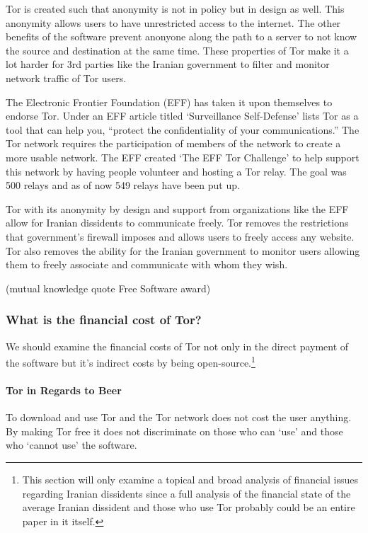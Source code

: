 \documentclass[11pt]{article}
\begin{document}
\begin{multicols}{2}
Tor is created such that anonymity is not in policy but in design as well. This
anonymity allows users to have unrestricted access to the internet. The other
benefits of the software prevent anonyone along the path to a server to not know
the source and destination at the same time. These properties of Tor make it a
lot harder for 3rd parties like the Iranian government to filter and monitor
network traffic of Tor users.

The Electronic Frontier Foundation (EFF) has taken it upon themselves to
endorse Tor. Under an EFF article titled `Surveillance Self-Defense' lists Tor
as a tool that can help you, ``protect the confidentiality of your
communications.''\cite{EFF:Tor} The Tor network requires the participation
of members of the network to create a more usable network. The EFF created `The
EFF Tor Challenge' to help support this network by having people volunteer and
hosting a Tor relay.\cite{EFF:TorChallenge} The goal was 500 relays and as of 
now 549 relays have been put up.\cite{EFF:TorChallenge}

Tor with its anonymity by design and support from organizations like the EFF
allow for Iranian dissidents to communicate freely. Tor removes the restrictions
that government's firewall imposes and allows users to freely access any
website. Tor also removes the ability for the Iranian government to monitor
users allowing them to freely associate and communicate with whom they wish. 

(mutual knowledge quote Free Software award)

\subsubsection{What is the financial cost of Tor?}

We should examine the financial costs of Tor not only in the direct payment of
the software but it's indirect costs by being open-source.\footnote{This section
  will only examine a topical and broad analysis of financial issues regarding
  Iranian dissidents since a full analysis of the financial state of the average
  Iranian dissident and those who use Tor probably could be an entire paper in
it itself.}

\paragraph{Tor in Regards to Beer}

To download and use Tor and the Tor network does not cost the user anything. By
making Tor free it does not discriminate on those who can `use' and those who
`cannot use' the software. 


\end{multicols}
\end{document}
